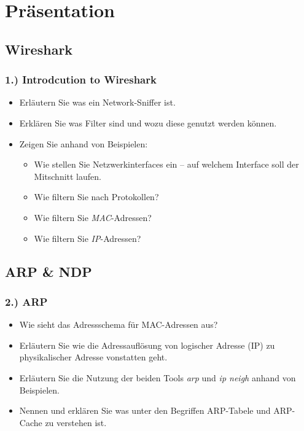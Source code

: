 \documentclass[xcolor=dvipsnames, aspectratio=169]{beamer}
\begin{document}
\section{Präsentation}
\subsection{Wireshark}
\begin{frame}
\frametitle{1.) Introdcution to Wireshark}
	\begin{itemize}
		\item Erläutern Sie was ein Network-Sniffer ist.
		\item Erklären Sie was Filter sind und wozu diese genutzt werden können.
		\item Zeigen Sie anhand von Beispielen:
		\begin{itemize}
			\item Wie stellen Sie Netzwerkinterfaces ein -- auf welchem Interface soll der Mitschnitt laufen.
			\item Wie filtern Sie nach Protokollen?
			\item Wie filtern Sie \emph{MAC}-Adressen?
			\item Wie filtern Sie \emph{IP}-Adressen?
		\end{itemize}
	\end{itemize}
\end{frame}

\subsection{ARP \& NDP}
\begin{frame}
	\frametitle{2.) ARP}
	\begin{itemize}
		\item Wie sieht das Adressschema für MAC-Adressen aus?
		\item Erläutern Sie wie die Adressauflösung von logischer Adresse (IP) zu physikalischer Adresse vonstatten geht.
		\item Erläutern Sie die Nutzung der beiden Tools \emph{arp} und \emph{ip neigh} anhand von Beispielen.
		\item Nennen und erklären Sie was unter den Begriffen ARP-Tabele und ARP-Cache zu verstehen ist.
	\end{itemize}
\end{frame}
\end{document}
